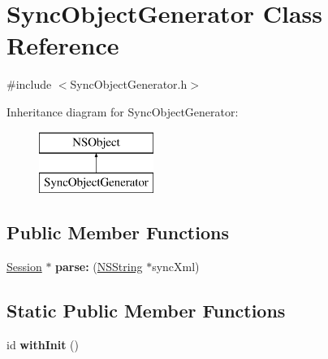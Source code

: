 \hypertarget{interface_sync_object_generator}{
\section{\-Sync\-Object\-Generator \-Class \-Reference}
\label{interface_sync_object_generator}
}


{\ttfamily \#include $<$\-Sync\-Object\-Generator.\-h$>$}

\-Inheritance diagram for \-Sync\-Object\-Generator\-:\begin{figure}[H]
\begin{center}
\leavevmode
\includegraphics[height=2.000000cm]{interface_sync_object_generator}
\end{center}
\end{figure}
\subsection*{\-Public \-Member \-Functions}
\begin{DoxyCompactItemize}
\item 
\hypertarget{interface_sync_object_generator_a5cfe911e5218a8d0030e26249b29ea9b}{
\hyperlink{interface_session}{\-Session} $\ast$ {\bfseries parse\-:} (\hyperlink{class_n_s_string}{\-N\-S\-String} $\ast$sync\-Xml)}
\label{interface_sync_object_generator_a5cfe911e5218a8d0030e26249b29ea9b}

\end{DoxyCompactItemize}
\subsection*{\-Static \-Public \-Member \-Functions}
\begin{DoxyCompactItemize}
\item 
\hypertarget{interface_sync_object_generator_aa1d5958a60931cc3f8ed745eb4d6497c}{
id {\bfseries with\-Init} ()}
\label{interface_sync_object_generator_aa1d5958a60931cc3f8ed745eb4d6497c}

\end{DoxyCompactItemize}


